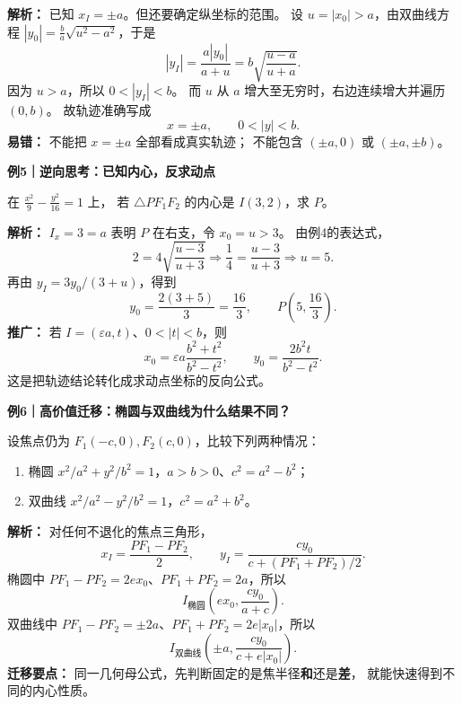 \begin{examplebox}
\textbf{解析：} 已知 $x_I=\pm a$。但还要确定纵坐标的范围。
设 $u=|x_0|>a$，由双曲线方程
$|y_0|=\frac ba\sqrt{u^2-a^2}$，于是
\[
|y_I|=\frac{a|y_0|}{a+u}
=b\sqrt{\frac{u-a}{u+a}}.
\]
因为 $u>a$，所以 $0<|y_I|<b$。
而 $u$ 从 $a$ 增大至无穷时，右边连续增大并遍历 $(0,b)$。
故轨迹准确写成
\[
\boxed{x=\pm a,\qquad 0<|y|<b.}
\]
\textbf{易错：} 不能把 $x=\pm a$ 全部看成真实轨迹；
不能包含 $(\pm a,0)$ 或 $(\pm a,\pm b)$。

\tcbline
\textbf{例5｜逆向思考：已知内心，反求动点}

在 $\frac{x^2}{9}-\frac{y^2}{16}=1$ 上，
若 $\triangle PF_1F_2$ 的内心是 $I(3,2)$，求 $P$。

\textbf{解析：} $I_x=3=a$ 表明 $P$ 在右支，令 $x_0=u>3$。
由例4的表达式，
\[
2=4\sqrt{\frac{u-3}{u+3}}
\Longrightarrow\frac14=\frac{u-3}{u+3}
\Longrightarrow u=5.
\]
再由 $y_I=3y_0/(3+u)$，得到
\[
y_0=\frac{2(3+5)}3=\frac{16}{3},\qquad
\boxed{P\left(5,\frac{16}{3}\right)}.
\]
\textbf{推广：} 若 $I=(\varepsilon a,t)$、$0<|t|<b$，则
\[
\boxed{x_0=\varepsilon a\frac{b^2+t^2}{b^2-t^2}},\qquad
\boxed{y_0=\frac{2b^2t}{b^2-t^2}}.
\]
这是把轨迹结论转化成求动点坐标的反向公式。

\tcbline
\textbf{例6｜高价值迁移：椭圆与双曲线为什么结果不同？}

设焦点仍为 $F_1(-c,0),F_2(c,0)$，比较下列两种情况：
\begin{enumerate}
  \item 椭圆 $x^2/a^2+y^2/b^2=1$，$a>b>0$、$c^2=a^2-b^2$；
  \item 双曲线 $x^2/a^2-y^2/b^2=1$，$c^2=a^2+b^2$。
\end{enumerate}

\textbf{解析：} 对任何不退化的焦点三角形，
\[
x_I=\frac{PF_1-PF_2}{2},\qquad
 y_I=\frac{cy_0}{c+(PF_1+PF_2)/2}.
\]
椭圆中 $PF_1-PF_2=2ex_0$、$PF_1+PF_2=2a$，所以
\[
\boxed{I_{\text{椭圆}}\left(ex_0,\frac{cy_0}{a+c}\right)}.
\]
双曲线中 $PF_1-PF_2=\pm2a$、$PF_1+PF_2=2e|x_0|$，所以
\[
\boxed{I_{\text{双曲线}}\left(\pm a,\frac{cy_0}{c+e|x_0|}\right)}.
\]
\textbf{迁移要点：} 同一几何母公式，先判断固定的是焦半径\textbf{和}还是\textbf{差}，
就能快速得到不同的内心性质。
\end{examplebox}
